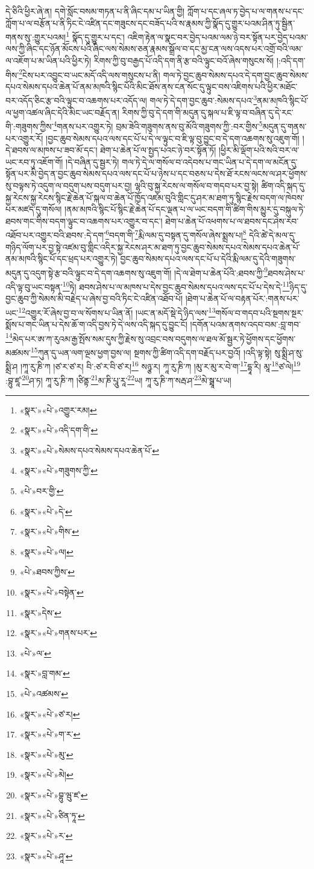 དེ་ཅིའི་ཕྱིར་ཞེ་ན། དགེ་སློང་བསམ་གཏན་པ་ནི་ཞིང་དམ་པ་ཡིན་གྱི། ཀློག་པ་དང་ཞལ་ཏ་བྱེད་པ་ལ་གནས་པ་དང་ཀློག་པ་ལ་བརྩོན་པ་ནི་ཏིང་ངེ་འཛིན་དང་གཟུངས་དང་བཟོད་པའི་ས་རྣམས་ཀྱི་སྣོད་དུ་གྱུར་པའམ་ཤིན་ཏུ་སྦྱིན་གནས་སུ་:གྱུར་པའམ།\footnote{«སྣར་»«པེ་»འགྱུར་རམ།} སྣོད་དུ་གྱུར་པ་དང་། འཇིག་རྟེན་ལ་སྣང་བར་བྱེད་པའམ་ལམ་ཉེ་བར་སྟོན་པར་བྱེད་པའམ་ལས་ཀྱི་ཞིང་དང་ཉོན་མོངས་པའི་ཞིང་ལས་སེམས་ཅན་རྣམས་སྒྲོལ་བ་དང་མྱ་ངན་ལས་འདས་པར་འགྲོ་བའི་ལམ་ལ་འཇོག་པ་མ་ཡིན་པའི་ཕྱིར་ཏེ། རིགས་ཀྱི་བུ་བརྒྱད་པོ་འདི་དག་ནི་རྩ་བའི་ལྟུང་བའོ་ཞེས་གསུངས་སོ། །:འདི་དག་གིས་\footnote{«སྣར་»«པེ་»འདི་དག་གི་}ངེས་པར་འབྱུང་བ་ཡང་མདོ་འདི་ལས་གསུངས་པ་ནི། གལ་ཏེ་བྱང་ཆུབ་སེམས་དཔའ་དེ་དག་བྱང་ཆུབ་སེམས་དཔའ་སེམས་དཔའ་ཆེན་པོ་ནམ་མཁའི་སྙིང་པོའི་མིང་ཐོས་ནས་ངན་སོང་དུ་ལྟུང་བས་འཇིགས་པའི་ཕྱིར་མཐོང་བར་འདོད་ཅིང་རྩ་བའི་ལྟུང་བ་འཆགས་པར་འདོད་ལ། གལ་ཏེ་དེ་དག་བྱང་ཆུབ་:སེམས་དཔའ་\footnote{«སྣར་»«པེ་»སེམས་དཔའ་སེམས་དཔའ་ཆེན་པོ་}ནམ་མཁའི་སྙིང་པོ་ལ་ཕྱག་འཚལ་ཞིང་དེའི་མིང་ཡང་བརྗོད་ན། རིགས་ཀྱི་བུ་དེ་དག་གི་མདུན་དུ་སྐལ་པ་ཇི་ལྟ་བ་བཞིན་དུ་དེ་རང་གི་:གཟུགས་ཀྱིས་\footnote{«སྣར་»«པེ་»གཟུགས་ཀྱི་}གནས་པར་འགྱུར་ཏེ། བྲམ་ཟེའི་གཟུགས་ནས་བུ་མོའི་གཟུགས་ཀྱི་:བར་གྱིས་\footnote{«པེ་»བར་གྱི་}མདུན་དུ་གནས་པར་འགྱུར་རོ། །བྱང་ཆུབ་སེམས་དཔའ་ལས་དང་པོ་པ་དེ་ལ་ལྟུང་བ་ཇི་ལྟ་བུ་བྱུང་བ་དེ་དག་འཆགས་སུ་འཇུག་གོ། །དེ་ཐབས་ལ་མཁས་པ་ཟབ་མོ་དང་། ཐེག་པ་ཆེན་པོ་ལ་སྤྱད་པའང་ཉེ་བར་སྟོན་ཏོ། །ཕྱིར་མི་ལྡོག་པའི་སའི་བར་ལ་ཡང་རབ་ཏུ་འཇོག་གོ། །དེ་བཞིན་དུ་སྦྱར་ཏེ། གལ་ཏེ་དེ་ལ་གསོལ་བ་འདེབས་པ་གང་ཡིན་པ་དེ་དག་ལ་མངོན་དུ་སྟོན་པར་མི་བྱེད་ན་བྱང་ཆུབ་སེམས་དཔའ་ལས་དང་པོ་པ་ཉེས་པ་དང་བཅས་པ་དེས་ཐོ་རངས་ལངས་ལ་ཤར་ཕྱོགས་སུ་བལྟས་ཏེ་འདུག་ལ་བདུག་པས་བདུག་པར་བྱ། ལྷའི་བུ་སྐྱ་རེངས་ལ་གསོལ་བ་གདབ་པར་བྱ་སྟེ། ཚིག་འདི་སྐད་དུ་སྐྱ་རེངས་སྐྱ་རེངས་སྙིང་རྗེ་ཆེན་པོ་སྐལ་བ་ཆེན་པོ་ཁྱོད་འཛམ་བུའི་གླིང་དུ་ཤར་མ་ཐག་ཏུ་སྙིང་རྗེས་བདག་ལ་ཁེབས་པར་མཛད་དུ་གསོལ། །ནམ་མཁའི་སྙིང་པོ་སྙིང་རྗེ་ཆེན་པོ་དང་ལྡན་པ་ལ་ཡང་བདག་གི་ཚིག་གིས་མྱུར་དུ་བསྐུལ་ཏེ་ཐབས་གང་གིས་བདག་ལྟུང་བ་འཆགས་པར་འགྱུར་བ་དང་། ཐེག་པ་ཆེན་པོ་འཕགས་པ་ལ་ཐབས་དང་ཤེས་རབ་འཐོབ་པར་འགྱུར་བའི་ཐབས་:དེ་དག་\footnote{«སྣར་»«པེ་»དེ་}བདག་གི་\footnote{«སྣར་»«པེ་»གིས་}རྨི་ལམ་དུ་བསྟན་དུ་གསོལ་ཞེས་སྨྲས་པ།\footnote{«སྣར་»«པེ་»ལ།} དེའི་ཚེ་དེ་མལ་དུ་གཉིད་ལོག་པར་བྱ་སྟེ་འཛམ་བུ་གླིང་འདིར་སྐྱ་རེངས་ཤར་མ་ཐག་ཏུ་བྱང་ཆུབ་སེམས་དཔའ་སེམས་དཔའ་ཆེན་པོ་ནམ་མཁའི་སྙིང་པོ་དང་ཕྲད་པར་འགྱུར་ཏེ། བྱང་ཆུབ་སེམས་དཔའ་ལས་དང་པོ་པ་དེའི་རྨི་ལམ་དུ་དེའི་གཟུགས་མདུན་དུ་འདུག་སྟེ་རྩ་བའི་ལྟུང་བ་དེ་དག་འཆགས་སུ་འཇུག་གོ། །དེ་ལ་ཐེག་པ་ཆེན་པོའི་:ཐབས་ཀྱི་\footnote{«པེ་»ཐབས་ཀྱིས་}ཐབས་ཤེས་པ་འདི་ལྟ་བུ་ཡང་བསྟན་\footnote{«སྣར་»«པེ་»བསྟེན་}ཏེ། ཐབས་ཤེས་པ་ལ་མཁས་པ་དེས་བྱང་ཆུབ་སེམས་དཔའ་ལས་དང་པོ་པ་དེས་དེ་\footnote{«སྣར་»དེས་}ཉིད་དུ་བྱང་ཆུབ་ཀྱི་སེམས་མི་བརྗེད་པ་ཞེས་བྱ་བའི་ཏིང་ངེ་འཛིན་འཐོབ་པོ། །ཐེག་པ་ཆེན་པོ་ལ་བརྟན་པོར་:གནས་པར་ཡང་\footnote{«སྣར་»«པེ་»གནས་པར་}འགྱུར་རོ་ཞེས་བྱ་བ་ལ་སོགས་པ་ཡིན་ནོ། །ཡང་ན་མདོ་སྡེ་དེ་ཉིད་ལས་\footnote{«པེ་»ལ་}གསོལ་བ་གདབ་པའི་སྔགས་སྔར་སྨོས་པ་གང་ཡིན་པ་དེས་ཆོ་ག་འདི་བྱས་ཏེ་དེ་ལས་འདི་སྐད་དུ་བྱུང་ངོ། །དགོན་པའམ་ནགས་འདབ་བམ་:བླ་གབ་\footnote{«སྣར་»བླ་གམ་}མེད་པར་ཨ་ཀ་རུའམ་རྒྱ་སྤོས་སམ་དུས་ཀྱི་རྗེས་སུ་འབྲང་བས་བདུགས་ལ་ཐལ་མོ་སྦྱར་ཏེ་ཕྱོགས་དང་ཕྱོགས་མཚམས་\footnote{«པེ་»འཚམས་}ཀུན་དུ་ཡན་ལག་ལྔས་ཕྱག་བྱས་ལ། སྔགས་ཀྱི་ཚིག་འདི་དག་བརྗོད་པར་བྱའོ། །འདི་ལྟ་སྟེ། སུ་སྨྲི་ཤ་སུ་སྨྲི་ཤ །ཀཱ་རུ་ཎི་ཀ །ཙ་ར་ཙ་ར། བི་:ཙ་ར་བི་ཙ་ར།\footnote{«སྣར་»«པེ་»ཙ་ར།} སཉྩ་ར། ཀཱ་རུ་ཎི་ཀ །མུ་ར་མུ་ར་བེ་ག་\footnote{«སྣར་»«པེ་»ག་ར་}དྷཱ་རི། མཱ་\footnote{«སྣར་»«པེ་»མུ་}ཙ་ལེ།\footnote{«སྣར་»«པེ་»མེ།} :བྷུ་ཛཱ་\footnote{«སྣར་»«པེ་»བྷུ་ཝུ་ཛ་}ཤ་ཏ། ཀཱ་རུ་ཎི་ཀ །ཙིནྟ་\footnote{«སྣར་»«པེ་»ཙིན་ཏཱ་}མ་ཎི་པཱུ་རཱ་\footnote{«སྣར་»«པེ་»ར་}ཡ། ཀཱ་རུ་ཎི་ཀ་སརྦ་ཤ་\footnote{«སྣར་»«པེ་»ཤཱ་}མེ་སྠཱ་པ་ཡ། 